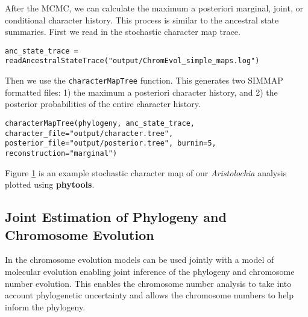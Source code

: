 After the MCMC, we can calculate the maximum a posteriori marginal, joint, or conditional
character history. This process is similar to the ancestral state summaries.
First we read in the stochastic character map trace.
{\tt \begin{snugshade*}
\begin{lstlisting}
anc_state_trace = readAncestralStateTrace("output/ChromEvol_simple_maps.log")
\end{lstlisting}
\end{snugshade*}}
Then we use the \texttt{characterMapTree} function. This generates two SIMMAP formatted files:
1) the maximum a posteriori character history, and 2) the posterior probabilities of the
entire character history.
{\tt \begin{snugshade*}
\begin{lstlisting}
characterMapTree(phylogeny, anc_state_trace, character_file="output/character.tree", posterior_file="output/posterior.tree", burnin=5, reconstruction="marginal")
\end{lstlisting}
\end{snugshade*}}
Figure \ref{fig:simmap} is an example stochastic character map of our \textit{Aristolochia} analysis plotted using \textbf{phytools}. 

\begin{figure}[h!]
\label{fig:simmap}
\end{figure}

\medskip
\subsection{Joint Estimation of Phylogeny and Chromosome Evolution}\label{subsect:joint_estimation}


In \RevBayes the chromosome evolution models can be used jointly with a model of molecular evolution 
enabling joint inference of the phylogeny and chromosome number evolution.
This enables the chromosome number analysis to take into account phylogenetic uncertainty 
and allows the chromosome numbers to help inform the phylogeny. 

